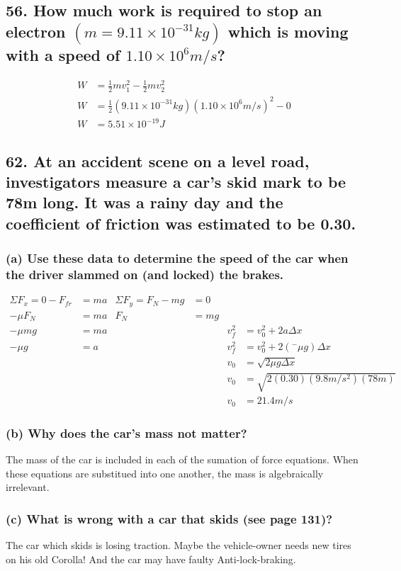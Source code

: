 \documentclass[12pt,a4paper,english]{article}
\begin{document}
\begin{flushleft}
  \subsection{56. How much work is required to stop an electron $(m=9.11\times10^{-31}kg)$ which is moving with a speed of $1.10\times10^6m/s$?}
  \begin{align*}
    W&=\frac{1}{2}mv_1^2-\frac{1}{2}mv_2^2
    \\
  W&=\frac{1}{2}(9.11\times10^{-31}kg)(1.10\times10^6m/s)^2-0
  \\
  W&=5.51\times10^{-19}J
  \end{align*}
  \subsection{62. At an accident scene on a level road, investigators measure a car's skid mark to be 78m long. It was a rainy day and the coefficient of friction was estimated to be 0.30.}
  \subsubsection{(a) Use these data to determine the speed of the car when the driver slammed on (and locked) the brakes.}
  \begin{align*}
    \Sigma F_x=0-F_{fr}
    &=ma
    &
    \Sigma F_y=F_N-mg&=0
    \\
    -\mu F_N&=ma
            &
    F_N&=mg
    \\
    -\mu mg&=ma
           &
           &&v_f^2&=v_0^2+2a\Delta x
    \\
    -\mu g&=a
          &
          &&v_f^2&=v_0^2+2(^-\mu g)\Delta x
    \\
          &&&&v_0&=\sqrt{2\mu g\Delta x}
          \\
          &&&&v_0&=\sqrt{2(0.30)(9.8m/s^2)(78m)}
          \\
          &&&&v_0&=21.4m/s
  \end{align*}
  \subsubsection{(b) Why does the car's mass not matter?}
  The mass of the car is included in each of the sumation of force equations. When these equations are substitued into one another, the mass is algebraically irrelevant.
  \subsubsection{(c) What is wrong with a car that skids (see page 131)?}
  The car which skids is losing traction. Maybe the vehicle-owner needs new tires on his old Corolla! And the car may have faulty Anti-lock-braking.

\end{flushleft}
\end{document}
